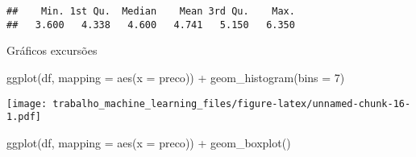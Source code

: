 \documentclass[
]{article}
\newenvironment{Shaded}{\begin{snugshade}}{\end{snugshade}}
\newcommand{\AttributeTok}[1]{\textcolor[rgb]{0.77,0.63,0.00}{#1}}
\newcommand{\CommentTok}[1]{\textcolor[rgb]{0.56,0.35,0.01}{\textit{#1}}}
\newcommand{\DecValTok}[1]{\textcolor[rgb]{0.00,0.00,0.81}{#1}}
\newcommand{\FloatTok}[1]{\textcolor[rgb]{0.00,0.00,0.81}{#1}}
\newcommand{\FunctionTok}[1]{\textcolor[rgb]{0.00,0.00,0.00}{#1}}
\newcommand{\NormalTok}[1]{#1}
\newcommand{\OtherTok}[1]{\textcolor[rgb]{0.56,0.35,0.01}{#1}}
\newcommand{\SpecialCharTok}[1]{\textcolor[rgb]{0.00,0.00,0.00}{#1}}
\newcommand{\StringTok}[1]{\textcolor[rgb]{0.31,0.60,0.02}{#1}}
\begin{document}
\begin{Shaded}
\end{Shaded}

\begin{verbatim}
##    Min. 1st Qu.  Median    Mean 3rd Qu.    Max. 
##   3.600   4.338   4.600   4.741   5.150   6.350
\end{verbatim}

\begin{Shaded}
\end{Shaded}

Gráficos excursões

\begin{Shaded}
\begin{Highlighting}[]
\FunctionTok{ggplot}\NormalTok{(df, }\AttributeTok{mapping =} \FunctionTok{aes}\NormalTok{(}\AttributeTok{x =} \StringTok{\textasciigrave{}}\AttributeTok{preco}\StringTok{\textasciigrave{}}\NormalTok{)) }\SpecialCharTok{+}
  \FunctionTok{geom\_histogram}\NormalTok{(}\AttributeTok{bins =} \DecValTok{7}\NormalTok{)}
\end{Highlighting}
\end{Shaded}

\texttt{[image: trabalho\_machine\_learning\_files/figure-latex/unnamed-chunk-16-1.pdf]}

\begin{Shaded}
\begin{Highlighting}[]
\FunctionTok{ggplot}\NormalTok{(df, }\AttributeTok{mapping =} \FunctionTok{aes}\NormalTok{(}\AttributeTok{x =} \StringTok{\textasciigrave{}}\AttributeTok{preco}\StringTok{\textasciigrave{}}\NormalTok{)) }\SpecialCharTok{+}
  \FunctionTok{geom\_boxplot}\NormalTok{()}
\end{Highlighting}
\end{Shaded}
\end{document}
